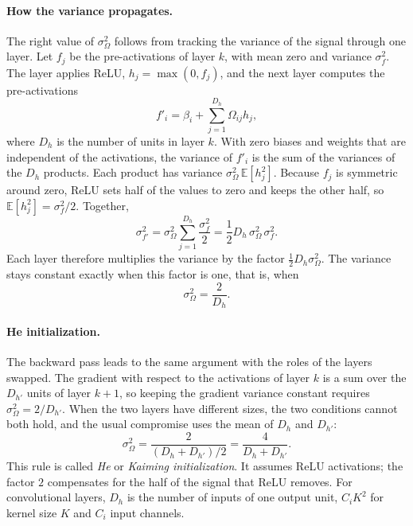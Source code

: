\paragraph{How the variance propagates.}
The right value of $\sigma_\Omega^2$ follows from tracking the variance of the
signal through one layer. Let $f_j$ be the pre-activations of layer $k$, with
mean zero and variance $\sigma_f^2$. The layer applies ReLU,
$h_j = \max(0, f_j)$, and the next layer computes the pre-activations
\begin{equation}
  f'_i = \beta_i + \sum_{j=1}^{D_h} \Omega_{ij} h_j ,
\end{equation}
where $D_h$ is the number of units in layer $k$. With zero biases and weights
that are independent of the activations, the variance of $f'_i$ is the sum of
the variances of the $D_h$ products. Each product has variance
$\sigma_\Omega^2\,\mathbb{E}[h_j^2]$. Because $f_j$ is symmetric around zero,
ReLU sets half of the values to zero and keeps the other half, so
$\mathbb{E}[h_j^2] = \sigma_f^2/2$. Together,
\begin{equation}
  \sigma_{f'}^2 = \sigma_\Omega^2 \sum_{j=1}^{D_h} \frac{\sigma_f^2}{2}
  = \frac{1}{2} D_h\, \sigma_\Omega^2\, \sigma_f^2 .
  \label{eq:var-propagation}
\end{equation}
\noindent
Each layer therefore multiplies the variance by the factor
$\tfrac12 D_h \sigma_\Omega^2$. The variance stays constant exactly when this
factor is one, that is, when
\begin{equation}
  \sigma_\Omega^2 = \frac{2}{D_h} .
  \label{eq:he-forward}
\end{equation}

\paragraph{He initialization.}
The backward pass leads to the same argument with the roles of the layers
swapped. The gradient with respect to the activations of layer $k$ is a sum over
the $D_{h'}$ units of layer $k+1$, so keeping the gradient variance constant
requires $\sigma_\Omega^2 = 2/D_{h'}$. When the two layers have different sizes,
the two conditions cannot both hold, and the usual compromise uses the mean of
$D_h$ and $D_{h'}$:
\begin{equation}
  \sigma_\Omega^2 = \frac{2}{(D_h + D_{h'})/2} = \frac{4}{D_h + D_{h'}} .
  \label{eq:he-init}
\end{equation}
\noindent
This rule is called \emph{He} or \emph{Kaiming initialization}. It assumes ReLU
activations; the factor $2$ compensates for the half of the signal that ReLU
removes. For convolutional layers, $D_h$ is the number of inputs of one output
unit, $C_i K^2$ for kernel size $K$ and $C_i$ input channels.

